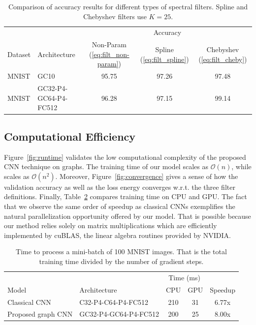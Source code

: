 \documentclass{article}
\newcommand{\bO}{\mathcal{O}}
\newcommand{\figref}[1]{Figure~\ref{fig:#1}}
\newcommand{\tabref}[1]{Table~\ref{tab:#1}}
\newcommand{\eqnref}[1]{(\ref{eq:#1})}
\newcommand{\bruna}{art:BrunaZarembaSzlamLeCun13DLgraphs,
art:HenaffBrunaLeCun15DLgraphs}
\newcommand{\todo}[1]{{\color{red} #1 }}
\begin{document}
\begin{table}[h!] \centering
\begin{tabular}{llccc} \toprule
& & \multicolumn{3}{c}{Accuracy} \\
\cmidrule{3-5}
Dataset & Architecture & Non-Param \eqnref{filt_non-param} &
Spline \eqnref{filt_spline} \cite{\bruna} &
Chebyshev \eqnref{filt_cheby} \\
\midrule
MNIST & GC10 & 95.75 & 97.26 & {97.48} \\
MNIST & GC32-P4-GC64-P4-FC512 & 96.28 & 97.15 & {99.14} \\
\bottomrule \end{tabular}
\caption{Comparison of accuracy results for different types of spectral filters.
Spline and Chebyshev filters use $K=25$.} %
\label{tab:filters}
\end{table}








\subsection{Computational Efficiency}


\figref{runtime} validates the low computational complexity of the proposed CNN technique on graphs. The training time of our model scales as $\bO(n)$, while \cite{\bruna} scales as $\bO(n^2)$. Moreover,
\figref{convergence} gives a sense of how the validation accuracy as well as the
loss energy converges w.r.t. the three filter definitions. Finally,
\tabref{speedup} compares training time on CPU and GPU. The fact that we observe
the same order of speedup as classical CNNs exemplifies the natural
parallelization opportunity offered by our model. That is possible because our
method relies solely on matrix multiplications which are efficiently implemented
by cuBLAS, the linear algebra routines provided by NVIDIA.

\begin{table}[ht] \centering
\begin{tabular}{llccc} \toprule
& & \multicolumn{2}{c}{Time (ms)} & \\
Model & Architecture & CPU & GPU & Speedup \\
\midrule
Classical CNN & C32-P4-C64-P4-FC512 & 210 & 31 & 6.77x \\
Proposed graph CNN & GC32-P4-GC64-P4-FC512 & 200 & 25 & 8.00x \\
\bottomrule \end{tabular}
\caption{Time to process a mini-batch of 100 MNIST images. That is the total
training time divided by the number of gradient steps.} 
\label{tab:speedup}
\end{table}
\end{document}
